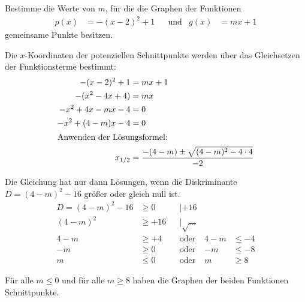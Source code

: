 \begin{bsp}
 Bestimme die Werte von \(m\), für die die Graphen der Funktionen
 \begin{align*}
  p(x) &= -(x-2)^2+1 &&\text{und}&
  g(x) &= mx + 1
 \end{align*}
 gemeinsame Punkte besitzen.
 
 Die \(x\)-Koordinaten der potenziellen Schnittpunkte werden über das Gleichsetzen der Funktionsterme bestimmt:
 \begin{align*}
  -(x-2)^2+1 &= mx +1\\
  -(x^2-4x+4) &= mx \\
  -x^2+4x-mx-4 &= 0 \\
  -x^2+(4-m)x -4 &= 0\\
  \intertext{Anwenden der Lösungsformel:}
  x_{1/2} &= \frac{-(4-m)\pm\sqrt{(4-m)^2-4\cdot 4}}{-2} 
 \end{align*}
 
 Die Gleichung hat nur dann Lösungen, wenn die Diskriminante \(D=(4-m)^2-16\) größer oder gleich null ist.
 \begin{align*}
  D=(4-m)^2-16&\geq 0&&|+16\\
    (4-m)^2 &\geq +16 &&|\sqrt{\ldots}\\
    4-m &\geq +4 & &\text{oder} & 4-m&\leq -4 \\
    -m &\geq 0 & &\text{oder} & -m&\leq -8 \\
    m &\leq 0 & &\text{oder} & m&\geq 8
 \end{align*}
 
 Für alle \(m\leq 0 \) und für alle \(m\geq 8\) haben die Graphen der beiden Funktionen Schnittpunkte.
 \begin{figure}
 \begin{center}
\end{center}
\end{figure}
\end{bsp}

